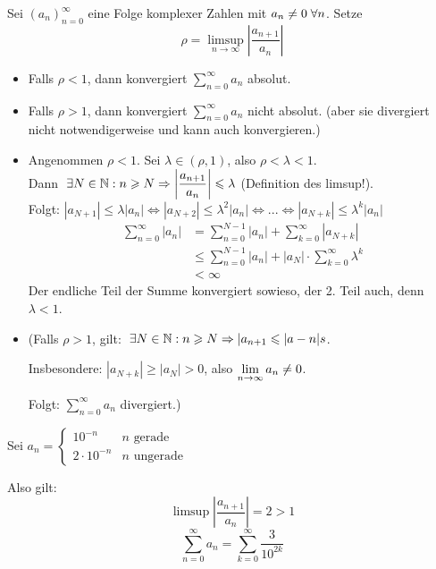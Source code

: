 \documentclass[main.tex]{subfiles}
\begin{document}
\begin{Korollar}
  Sei $(a_n)_{n=0}^\infty$ eine Folge komplexer Zahlen mit $a_n \neq 0 \;\forall n$. Setze
  $$\rho = \limsup_{n\to \infty}\left|\dfrac{a_{n+1}}{a_n}\right|$$
  \begin{itemize}
    \item Falls $\rho < 1$, dann konvergiert $\sum \limits_{n=0}^\infty a_n$ absolut.
    \item Falls $\rho > 1$, dann konvergiert $\sum \limits_{n=0}^\infty a_n$ nicht absolut. (aber sie divergiert nicht notwendigerweise und kann auch konvergieren.)
  \end{itemize}
\end{Korollar}

\begin{Beweis}
  \begin{itemize}
    \item Angenommen $\rho < 1$. Sei $\lambda \in (\rho,1)$, also $\rho < \lambda < 1$.\\
      Dann $\;\exists N \in \mathbb{N} : n \geqslant N \Rightarrow \left| \dfrac{a_{n+1}}{a_n} \right| \leqslant \lambda$ (Definition des limsup!).\\
      Folgt: $|a_{N+1}| \leq \lambda |a_n| \Leftrightarrow |a_{N+2}| \leq \lambda^2 |a_n| \Leftrightarrow ... \Leftrightarrow |a_{N+k}| \leq \lambda^k |a_n|$
      $$\begin{aligned}
        \sum \limits_{n=0}^\infty |a_n| &= \sum \limits_{n=0}^{N-1} |a_n| + \sum \limits_{k=0}^\infty |a_{N+k}|\\
        &\leq \sum \limits_{n=0}^{N-1} |a_n| + |a_N|\cdot \sum \limits_{k=0}^\infty \lambda^k \\
        &< \infty
      \end{aligned}$$
      Der endliche Teil der Summe konvergiert sowieso, der 2. Teil auch, denn $\lambda <1$.
    \item (Falls $\rho > 1$, gilt: $\;\exists N \in \mathbb{N} : n \geqslant N \Rightarrow |a_{n+1} \leqslant |a-n|s$.

      Insbesondere: $|a_{N+k}| \geq |a_N| > 0$, also $\lim \limits_{n \to \infty} a_n \neq 0$.

      Folgt: $\sum \limits_{n=0}^\infty a_n$ divergiert.)
  \end{itemize}
\end{Beweis}

\begin{Beispiel}
  Sei $a_n = \left\{\begin{aligned}
    10^{-n} & n \text{ gerade}\\
    2 \cdot 10^{-n} & n \text{ ungerade}
  \end{aligned}\right.$

  Also gilt: $$\limsup \left| \dfrac{a_{n+1}}{a_n} \right| = 2 > 1$$
  $$\sum \limits_{n=0}^\infty a_n = \sum \limits_{k=0}^\infty \dfrac{3}{10^{2k}}$$
\end{Beispiel}
\end{document}
